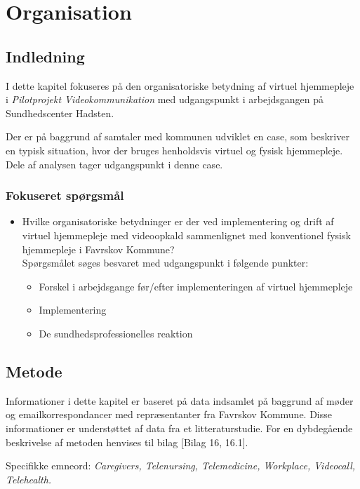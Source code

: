 \chapter{Organisation}

\section{Indledning}
I dette kapitel fokuseres på den organisatoriske betydning af virtuel hjemmepleje i \textit{Pilotprojekt Videokommunikation} med udgangspunkt i arbejdsgangen på Sundhedscenter Hadsten. 

Der er på baggrund af samtaler med kommunen udviklet en case, som beskriver en typisk situation, hvor der bruges henholdsvis virtuel og fysisk hjemmepleje. Dele af analysen tager udgangspunkt i denne case. 

\subsection{Fokuseret spørgsmål}

\begin{itemize}
	\item Hvilke organisatoriske betydninger er der ved implementering og drift af virtuel hjemmepleje med videoopkald sammenlignet med konventionel fysisk hjemmepleje i Favrskov Kommune? \\Spørgsmålet søges besvaret med udgangspunkt i følgende punkter:
	\begin{itemize}
	\item Forskel i arbejdsgange før/efter implementeringen af virtuel hjemmepleje
	\item Implementering
	\item De sundhedsprofessionelles reaktion
\end{itemize}
\end{itemize}


\section{Metode}
Informationer i dette kapitel er baseret på data indsamlet på baggrund af møder og emailkorrespondancer med repræsentanter fra Favrskov Kommune. Disse informationer er understøttet af data fra et litteraturstudie.  For en dybdegående beskrivelse af metoden henvises til bilag [Bilag 16, 16.1].

Specifikke emneord: \textit{Caregivers, Telenursing, Telemedicine, Workplace, Videocall, Telehealth.}

